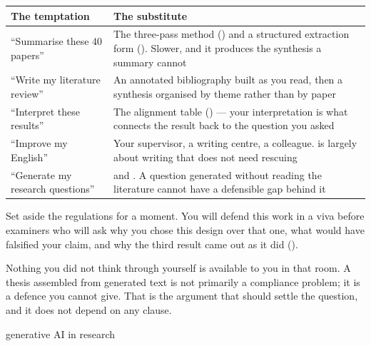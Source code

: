 \begin{center}
\small
\begin{tabular}{@{}L{4.4cm}L{9.9cm}@{}}
\toprule
\textbf{The temptation} & \textbf{The substitute} \\
\midrule
``Summarise these 40 papers''
  & The three-pass method () and a structured extraction form
    (). Slower, and it produces the synthesis a summary cannot \\
``Write my literature review''
  & An annotated bibliography built as you read, then a synthesis organised by
    theme rather than by paper \\
``Interpret these results''
  & The alignment table () --- your interpretation is what
    connects the result back to the question you asked \\
``Improve my English''
  & Your supervisor, a writing centre, a colleague.  is largely
    about writing that does not need rescuing \\
``Generate my research questions''
  &  and . A question generated without reading
    the literature cannot have a defensible gap behind it \\
\bottomrule
\end{tabular}
\end{center}

\begin{conceptbox}
Set aside the regulations for a moment. You will defend this work in a viva
before examiners who will ask why you chose this design over that one, what
would have falsified your claim, and why the third result came out as it did
().

\medskip
Nothing you did not think through yourself is available to you in that room.
A thesis assembled from generated text is not primarily a compliance problem;
it is a defence you cannot give. That is the argument that should settle the
question, and it does not depend on any clause.
\end{conceptbox}

\begin{traditions}{generative AI in research}
\end{traditions}

